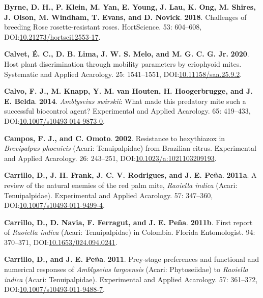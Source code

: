 \documentclass[12pt,final,CPage]{ufthesis}
\newlength{\cslhangindent}
\newenvironment{CSLReferences}[2] %
{%
	\setlength{\parindent}{0pt}
	\ifodd #1 \everypar{\setlength{\hangindent}{\cslhangindent}}\ignorespaces\fi
	\ifnum #2 > 0
	\setlength{\parskip}{#2\baselineskip}
	\fi
}%
{}
\begin{document}
{\begin{CSLReferences}{1}{0}
  \leavevmode{}%
  \textbf{Byrne, D. H., P. Klein, M. Yan, E. Young, J. Lau, K. Ong, M. Shires, J. Olson, M. Windham, T. Evans, and D. Novick}. \textbf{2018}. Challenges of breeding {Rose rosette}-resistant roses. {HortScience}. 53: 604--608, DOI:\href{https://doi.org/10.21273/hortsci12553-17}{10.21273/hortsci12553-17}.

  \leavevmode{}%
  \textbf{Calvet, É. C., D. B. Lima, J. W. S. Melo, and M. G. C. G. Jr.} \textbf{2020}. Host plant discrimination through mobility parameters by eriophyoid mites. Systematic and Applied Acarology. 25: 1541--1551, DOI:\href{https://doi.org/10.11158/saa.25.9.2}{10.11158/saa.25.9.2}.

  \leavevmode{}%
  \textbf{Calvo, F. J., M. Knapp, Y. M. van Houten, H. Hoogerbrugge, and J. E. Belda}. \textbf{2014}. {\emph{Amblyseius swirskii}}: What made this predatory mite such a successful biocontrol agent? Experimental and Applied Acarology. 65: 419--433, DOI:\href{https://doi.org/10.1007/s10493-014-9873-0}{10.1007/s10493-014-9873-0}.

  \leavevmode{}%
  \textbf{Campos, F. J., and C. Omoto}. \textbf{2002}. Resistance to hexythiazox in {\emph{Brevipalpus phoenicis}} ({Acari}: {Tenuipalpidae}) from {Brazilian} citrus. Experimental and Applied Acarology. 26: 243--251, DOI:\href{https://doi.org/10.1023/a:1021103209193}{10.1023/a:1021103209193}.

  \leavevmode{}%
  \textbf{Carrillo, D., J. H. Frank, J. C. V. Rodrigues, and J. E. Peña}. \textbf{2011a}. A review of the natural enemies of the red palm mite, {\emph{Raoiella indica}} ({Acari}: {Tenuipalpidae}). Experimental and Applied Acarology. 57: 347--360, DOI:\href{https://doi.org/10.1007/s10493-011-9499-4}{10.1007/s10493-011-9499-4}.

  \leavevmode{}%
  \textbf{Carrillo, D., D. Navia, F. Ferragut, and J. E. Peña}. \textbf{2011b}. First report of {\emph{Raoiella indica}} ({Acari}: {Tenuipalpidae}) in {Colombia}. Florida Entomologist. 94: 370--371, DOI:\href{https://doi.org/10.1653/024.094.0241}{10.1653/024.094.0241}.

  \leavevmode{}%
  \textbf{Carrillo, D., and J. E. Peña}. \textbf{2011}. Prey-stage preferences and functional and numerical responses of {\emph{Amblyseius largoensis}} ({Acari: Phytoseiidae}) to {\emph{Raoiella indica}} ({Acari}: {Tenuipalpidae}). Experimental and Applied Acarology. 57: 361--372, DOI:\href{https://doi.org/10.1007/s10493-011-9488-7}{10.1007/s10493-011-9488-7}.


\end{CSLReferences}}
\end{document}
